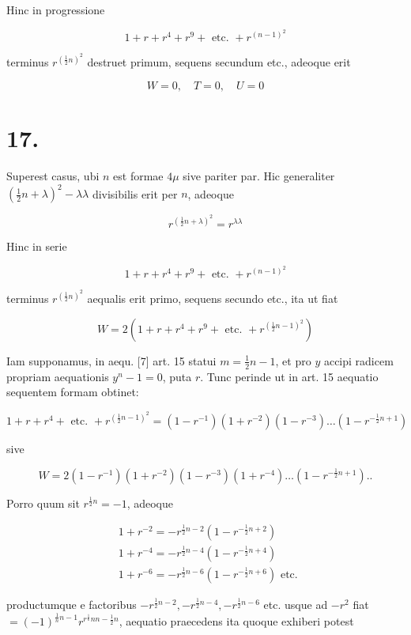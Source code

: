 \documentclass[10pt]{article}
\begin{document}
Hinc in progressione

\[
1+r+r^{4}+r^{9}+\text { etc. }+r^{(n-1)^{2}}
\]

terminus \(r^{\left(\frac{1}{2} n\right)^{2}}\) destruet primum, sequens secundum etc., adeoque erit

\[
W=0, \quad T=0, \quad U=0
\]

\section*{17.}
Superest casus, ubi \(n\) est formae \(4 \mu\) sive pariter par. Hic generaliter \(\left(\frac{1}{2} n+\lambda\right)^{2}-\lambda \lambda\) divisibilis erit per \(n\), adeoque

\[
r^{\left(\frac{1}{2} n+\lambda\right)^{2}}=r^{\lambda \lambda}
\]

Hinc in serie

\[
1+r+r^{4}+r^{9}+\text { etc. }+r^{(n-1)^{2}}
\]

terminus \(r^{\left(\frac{1}{2} n\right)^{2}}\) aequalis erit primo, sequens secundo etc., ita ut fiat

\[
W=2\left(1+r+r^{4}+r^{9}+\text { etc. }+r^{\left(\frac{1}{2} n-1\right)^{2}}\right)
\]

Iam supponamus, in aequ. [7] art. 15 statui \(m=\frac{1}{2} n-1\), et pro \(y\) accipi radicem propriam aequationis \(y^{n}-1=0\), puta \(r\). Tunc perinde ut in art. 15 aequatio sequentem formam obtinet:

\[
1+r+r^{4}+\text { etc. }+r^{\left(\frac{1}{2} n-1\right)^{2}}=\left(1-r^{-1}\right)\left(1+r^{-2}\right)\left(1-r^{-3}\right) \ldots\left(1-r^{-\frac{1}{2} n+1}\right)
\]

sive

\[
W=2\left(1-r^{-1}\right)\left(1+r^{-2}\right)\left(1-r^{-3}\right)\left(1+r^{-4}\right) \ldots\left(1-r^{-\frac{1}{2} n+1}\right) . .
\]

Porro quum sit \(r^{\frac{1}{2} n}=-1\), adeoque

\[
\begin{aligned}
& 1+r^{-2}=-r^{\frac{1}{2} n-2}\left(1-r^{-\frac{1}{2} n+2}\right) \\
& 1+r^{-4}=-r^{\frac{1}{2} n-4}\left(1-r^{-\frac{1}{2} n+4}\right) \\
& 1+r^{-6}=-r^{\frac{1}{2} n-6}\left(1-r^{-\frac{1}{2} n+6}\right) \text { etc. }
\end{aligned}
\]

productumque e factoribus \(-r^{\frac{1}{2} n-2},-r^{\frac{1}{2} n-4},-r^{\frac{1}{2} n-6}\) etc. usque ad \(-r^{2}\) fiat \(=(-1)^{\frac{1}{n} n-1} r^{r^{\frac{1}{6}} n n-\frac{1}{2} n}\), aequatio praecedens ita quoque exhiberi potest
\end{document}
